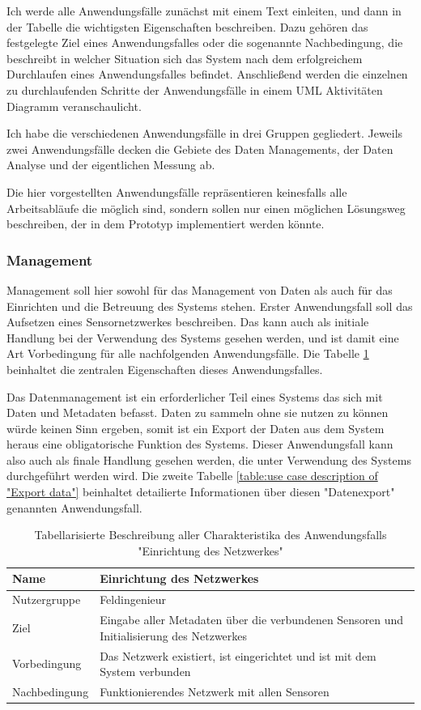 Ich werde alle Anwendungsfälle zunächst mit einem Text einleiten, und dann in der Tabelle die wichtigsten Eigenschaften beschreiben. Dazu gehören das festgelegte Ziel eines Anwendungsfalles oder die sogenannte Nachbedingung, die beschreibt in welcher Situation sich das System nach dem erfolgreichem Durchlaufen eines Anwendungsfalles befindet. Anschließend werden die einzelnen zu durchlaufenden Schritte der Anwendungsfälle in einem UML Aktivitäten Diagramm veranschaulicht.

Ich habe die verschiedenen Anwendungsfälle in drei Gruppen gegliedert. Jeweils zwei Anwendungsfälle decken die Gebiete des Daten Managements, der Daten Analyse und der eigentlichen Messung ab.

Die hier vorgestellten Anwendungsfälle repräsentieren keinesfalls alle Arbeitsabläufe die möglich sind, sondern sollen nur einen möglichen Lösungsweg beschreiben, der in dem Prototyp implementiert werden könnte.

\subsubsection{Management}
Management soll hier sowohl für das Management von Daten als auch für das Einrichten und die Betreuung des Systems stehen. Erster Anwendungsfall soll das Aufsetzen eines Sensornetzwerkes beschreiben. Das kann auch als initiale Handlung bei der Verwendung des Systems gesehen werden, und ist damit eine Art Vorbedingung für alle nachfolgenden Anwendungsfälle. Die Tabelle \ref{table:use case description of "Set up network"} beinhaltet die zentralen Eigenschaften dieses Anwendungsfalles.

Das Datenmanagement ist ein erforderlicher Teil eines Systems das sich mit Daten und Metadaten befasst. Daten zu sammeln ohne sie nutzen zu können würde keinen Sinn ergeben, somit ist ein Export der Daten aus dem System heraus eine obligatorische Funktion des Systems. Dieser Anwendungsfall kann also auch als finale Handlung gesehen werden, die unter Verwendung des Systems durchgeführt werden wird. Die zweite Tabelle \ref{table:use case description of "Export data"} beinhaltet detailierte Informationen über diesen "Datenexport" genannten Anwendungsfall.

\begin{table}[H]
\centering
\begin{tabular}{l | p{11cm}}
Name & Einrichtung des Netzwerkes\\ \hline 
Nutzergruppe & Feldingenieur\\ \hline 
Ziel & Eingabe aller Metadaten über die verbundenen Sensoren und Initialisierung des Netzwerkes\\ \hline 
Vorbedingung & Das Netzwerk existiert, ist eingerichtet und ist mit dem System verbunden\\ \hline 
Nachbedingung & Funktionierendes Netzwerk mit allen Sensoren\\ 
\end{tabular}
\caption{Tabellarisierte Beschreibung aller Charakteristika des Anwendungsfalls "Einrichtung des Netzwerkes"} 
\label{table:use case description of "Set up network"}
\end{table}


